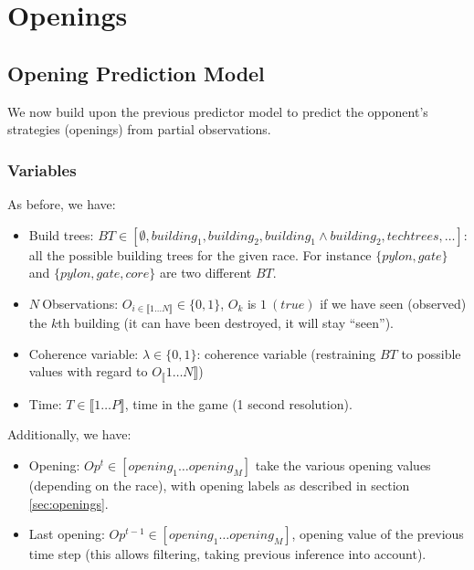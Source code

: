 \clearpage
\section{Openings}

\subsection{Opening Prediction Model}
We now build upon the previous  predictor model to predict the opponent's strategies (openings) from partial observations.



\subsubsection{Variables}
As before, we have:
\begin{itemize}
\item Build trees: $BT \in [\emptyset, building_1, building_2, building_1\wedge building_2, techtrees, \dots]$: all the possible building trees for the given race. For instance $\{pylon, gate\}$ and $\{pylon, gate, core\}$ are two different $BT$.
\item $N\ $Observations: $O_{i \in \llbracket 1\dots N \rrbracket} \in \{0, 1\}$, $O_k$ is $1\ (true)$ if we have seen (observed) the $k$th building (it can have been destroyed, it will stay ``seen'').
\item Coherence variable: $\lambda \in \{0, 1\}$: coherence variable (restraining $BT$ to possible values with regard to $O_\llbracket 1 \dots N \rrbracket$)
\item Time: $T \in \llbracket 1\dots P \rrbracket$, time in the game (1 second resolution).
\end{itemize}
Additionally, we have:
\begin{itemize}
\item Opening: $Op^t \in [opening_1 \dots opening_M]$ take the various opening values (depending on the race), with opening labels as described in section \ref{sec:openings}.
\item Last opening: $Op^{t-1} \in [opening_1 \dots opening_M]$, opening value of the previous time step (this allows filtering, taking previous inference into account).
\end{itemize}

